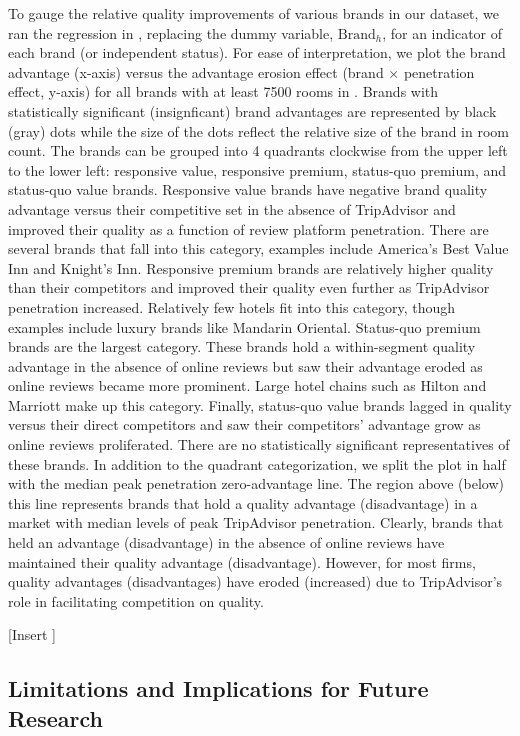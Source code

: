 \documentclass{informs_mod} %
\begin{document}
To gauge the relative quality improvements of various brands in our dataset, we ran the regression in , replacing the dummy variable, $\text{Brand}_h$, for an indicator of each brand (or independent status). For ease of interpretation, we plot the brand advantage (x-axis) versus the advantage erosion effect (brand $\times$ penetration effect, y-axis) for all brands with at least 7500 rooms in . Brands with statistically significant (insignficant) brand advantages are represented by black (gray) dots while the size of the dots reflect the relative size of the brand in room count. The brands can be grouped into 4 quadrants clockwise from the upper left to the lower left: responsive value, responsive premium, status-quo premium, and status-quo value brands. Responsive value brands have negative brand quality advantage versus their competitive set in the absence of TripAdvisor and improved their quality as a function of review platform penetration. There are several brands that fall into this category, examples include America's Best Value Inn and Knight's Inn. Responsive premium brands are relatively higher quality than their competitors and improved their quality even further as TripAdvisor penetration increased. Relatively few hotels fit into this category, though examples include luxury brands like Mandarin Oriental. Status-quo premium brands are the largest category. These brands hold a within-segment quality advantage in the absence of online reviews but saw their advantage eroded as online reviews became more prominent. Large hotel chains such as Hilton and Marriott make up this category. Finally, status-quo value brands lagged in quality versus their direct competitors and saw their competitors' advantage grow as online reviews proliferated. There are no statistically significant representatives of these brands. In addition to the quadrant categorization, we split the plot in half with the median peak penetration zero-advantage line. The region above (below) this line represents brands that hold a quality advantage (disadvantage) in a market with median levels of peak TripAdvisor penetration. Clearly, brands that held an advantage (disadvantage) in the absence of online reviews have maintained their quality advantage (disadvantage). However, for most firms, quality advantages (disadvantages) have eroded (increased) due to TripAdvisor's role in facilitating competition on quality. 

[Insert ]

\subsection{Limitations and Implications for Future Research}
\end{document}
